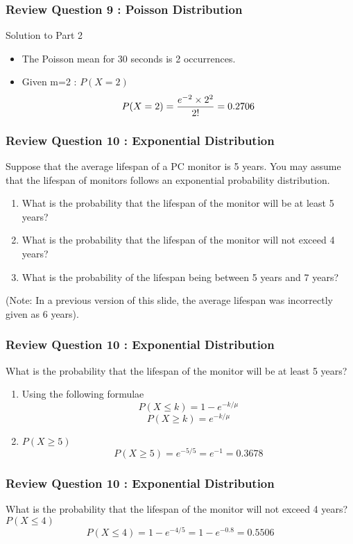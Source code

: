 \begin{frame}
\frametitle{Review Question 9 :  Poisson Distribution}
Solution to Part 2
\begin{itemize}
\item The Poisson mean for 30 seconds is 2 occurrences.
\item Given m=2 : $P(X = 2)$
\[P(X = 2) = { e^{-2} \times 2^2\over 2!} = 0.2706 \]
\end{itemize}
\end{frame}

\begin{frame}
\frametitle{Review Question 10 :  Exponential Distribution}
Suppose that the average lifespan of a PC monitor is 5 years. You may assume that the lifespan of monitors follows an exponential probability distribution.
    \begin{enumerate}
    \item What is the probability that the lifespan of the monitor will be at least 5 years?
    \item What is the probability that the lifespan of the monitor will not exceed 4 years?
    \item What is the probability of the lifespan being between 5 years and 7 years?
    \end{enumerate}
(Note: In a previous version of this slide, the average lifespan was incorrectly given as 6 years).
\end{frame}
\begin{frame}
\frametitle{Review Question 10 :  Exponential Distribution}
What is the probability that the lifespan of the monitor will be at least 5 years?
    \begin{enumerate}
    \item Using the following formulae
    \[P(X \leq k) = 1-e^{-k/\mu}\]
    \[P(X \geq k) = e^{-k/\mu}\]
    \item $P(X\geq 5)$
    \[P(X \geq 5) = e^{-5/5} = e^{-1} = 0.3678 \]
    \end{enumerate}
\end{frame}

\begin{frame}
\frametitle{Review Question 10 :  Exponential Distribution}
What is the probability that the lifespan of the monitor will not exceed 4 years?
$P(X\leq 4)$
    \[P(X \leq 4) = 1- e^{-4/5} = 1 - e^{-0.8} = 0.5506 \]

\end{frame}

